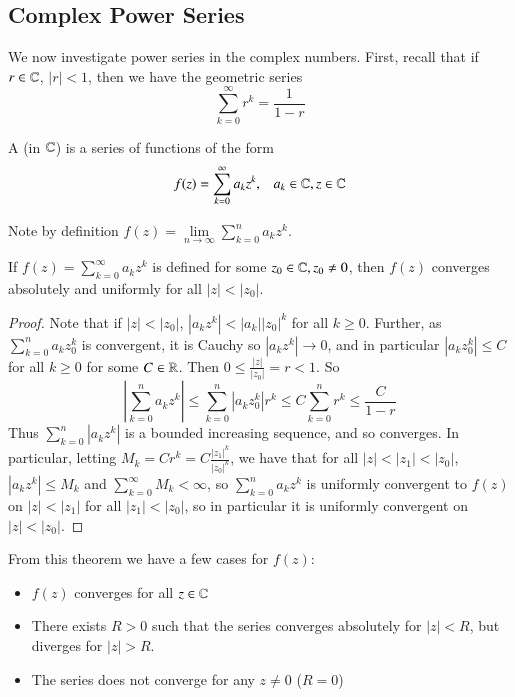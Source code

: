 \subsection{Complex Power Series}


We now investigate power series in the complex numbers. First, recall that if $r \in \mathbb C$, $|r| < 1$, then we have the geometric series \begin{equation*}
    \sum_{k=0}^{\infty}r^k = \frac{1}{1-r}
\end{equation*}

\begin{defn}
    A  (in $\mathbb C$) is a series of functions of the form \begin{equation*}
        f(z) = \sum_{k=0}^{\infty}a_kz^k,\;\;\;a_k \in \mathbb C, z \in \mathbb C
    \end{equation*}
\end{defn}
Note by definition $f(z) = \lim\limits_{n\rightarrow \infty}\sum_{k=0}^na_kz^k$.

\begin{prop}\label{prop:3.3.1}
    If $f(z) = \sum_{k=0}^{\infty}a_kz^k$ is defined for some $z_0 \in \mathbb C, z_0 \neq 0$, then $f(z)$ converges absolutely and uniformly for all $|z| < |z_0|$.
\end{prop}
\begin{proof}
    Note that if $|z| < |z_0|$, $|a_kz^k| < |a_k||z_0|^k$ for all $k \geq 0$. Further, as $\sum_{k=0}^na_kz_0^k$ is convergent, it is Cauchy so $|a_kz^k|\rightarrow 0$, and in particular $|a_kz_0^k| \leq C$ for all $ k\geq 0$ for some $C \in \mathbb R$. Then $0 \leq \frac{|z|}{|z_0|} = r < 1$. So $$\left|\sum_{k=0}^na_kz^k\right| \leq \sum_{k=0}^n|a_kz_0^k|r^k \leq C\sum_{k=0}^nr^k \leq \frac{C}{1-r}$$ Thus $\sum_{k=0}^n|a_kz^k|$ is a bounded increasing sequence, and so converges. In particular, letting $M_k = Cr^k = C\frac{|z_1|^k}{|z_0|^k}$, we have that for all $|z| < |z_1| < |z_0|$, $|a_kz^k| \leq M_k$ and $\sum_{k=0}^{\infty}M_k < \infty$, so $\sum_{k=0}^na_kz^k$ is uniformly convergent to $f(z)$ on $|z| < |z_1|$ for all $|z_1| < |z_0|$, so in particular it is uniformly convergent on $|z| < |z_0|$.
\end{proof}

From this theorem we have a few cases for $f(z)$: \begin{itemize}
    \item $f(z)$ converges for all $z \in \mathbb C$
    \item There exists $R  > 0$ such that the series converges absolutely for $|z| < R$, but diverges for $|z| > R$.
    \item The series does not converge for any $z \neq 0$ ($R = 0$)
\end{itemize}

